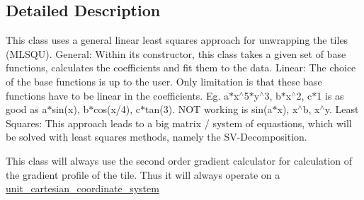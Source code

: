 \subsection{Detailed Description}
This class uses a general linear least squares approach for unwrapping the tiles (M\-L\-S\-Q\-U). General\-: Within its constructor, this class takes a given set of base functions, calculates the coefficients and fit them to the data. Linear\-: The choice of the base functions is up to the user. Only limitation is that these base functions have to be linear in the coefficients. Eg. a$\ast$x$^\wedge$5$\ast$y$^\wedge$3, b$\ast$x$^\wedge$2, c$\ast$1 is as good as a$\ast$sin(x), b$\ast$cos(x/4), c$\ast$tan(3). N\-O\-T working is sin(a$\ast$x), x$^\wedge$b, x$^\wedge$y. Least Squares\-: This approach leads to a big matrix / system of equastions, which will be solved with least squares methods, namely the S\-V-\/\-Decomposition.

This class will always use the second order gradient calculator for calculation of the gradient profile of the tile. Thus it will always operate on a \hyperlink{classunit__cartesian__coordinate__system}{unit\-\_\-cartesian\-\_\-coordinate\-\_\-system} 

